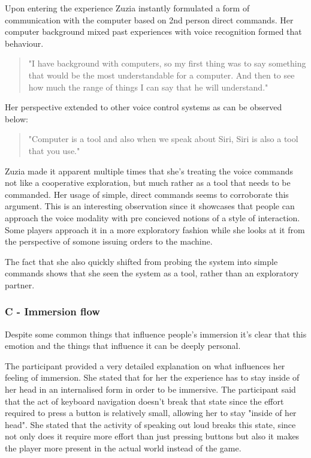 Upon entering the experience Zuzia instantly formulated a form of communication with the computer based on 2nd person direct commands. Her computer background mixed past experiences with voice recognition formed that behaviour. 

\begin{quote}
    "I have background with computers, so my first thing was to say something that would be the most understandable for a computer. And then to see how much the range of things I can say that he will understand."
\end{quote}

Her perspective extended to other voice control systems as can be observed below:
\begin{quote}
    "Computer is a tool and also when we speak about Siri, Siri is also a tool that you use."
\end{quote}

Zuzia made it apparent multiple times that she's treating the voice commands not like a cooperative exploration, but much rather as a tool that needs to be commanded. Her usage of simple, direct commands seems to corroborate this argument. This is an interesting observation since it showcases that people can approach the voice modality with pre concieved notions of a style of interaction. Some players approach it in a more exploratory fashion while she looks at it from the perspective of somone issuing orders to the machine. 

The fact that she also quickly shifted from probing the system into simple commands shows that she seen the system as a tool, rather than an exploratory partner.


\subsubsection{C - Immersion flow}

Despite some common things that influence people's immersion it's clear that this emotion and the things that influence it can be deeply personal. 

The participant provided a very detailed explanation on what influences her feeling of immersion. She stated that for her the experience has to stay inside of her head in an internalised form in order to be immersive. The participant said that the act of keyboard navigation doesn't break that state since the effort required to press a button is relatively small, allowing her to stay "inside of her head".  She stated that the activity of speaking out loud breaks this state, since not only does it require more effort than just pressing buttons but also it makes the player more present in the actual world instead of the game. 

